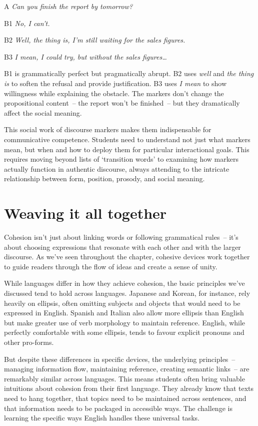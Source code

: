 \begin{dialogue}
\item[A] \textit{Can you finish the report by tomorrow?}
\item[B1] \textit{No, I can't.}
\item[B2] \textit{Well, the thing is, I'm still waiting for the sales figures.}
\item[B3] \textit{I mean, I could try, but without the sales figures\dots}
\end{dialogue}

B1 is grammatically perfect but pragmatically abrupt. B2 uses \textit{well} and \textit{the thing is} to soften the refusal and provide justification. B3 uses \textit{I mean} to show willingness while explaining the obstacle. The markers don't change the propositional content~-- the report won't be finished~-- but they dramatically affect the social meaning.

This social work of discourse markers makes them indispensable for communicative competence. Students need to understand not just what markers mean, but when and how to deploy them for particular interactional goals. This requires moving beyond lists of `transition words' to examining how markers actually function in authentic discourse, always attending to the intricate relationship between form, position, prosody, and social meaning.


\section{Weaving it all together} 

Cohesion isn't just about linking words or following grammatical rules~-- it's about choosing expressions that resonate with each other and with the larger discourse. As we've seen throughout the chapter, cohesive devices work together to guide readers through the flow of ideas and create a sense of unity.

While languages differ in how they achieve cohesion, the basic principles we've discussed tend to hold across languages. Japanese and Korean, for instance, rely heavily on ellipsis, often omitting subjects and objects that would need to be expressed in English. Spanish and Italian also allow more ellipsis than English but make greater use of verb morphology to maintain reference. English, while perfectly comfortable with some ellipsis, tends to favour explicit pronouns and other pro-forms.

But despite these differences in specific devices, the underlying principles~-- managing information flow, maintaining reference, creating semantic links~-- are remarkably similar across languages. This means students often bring valuable intuitions about cohesion from their first language. They already know that texts need to hang together, that topics need to be maintained across sentences, and that information needs to be packaged in accessible ways. The challenge is learning the specific ways English handles these universal tasks.

